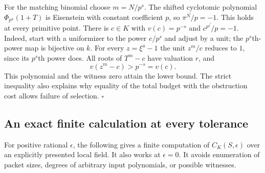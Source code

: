 For the matching binomial choose $m=N/p^s$. The shifted cyclotomic polynomial $\Phi_{p^h}(1+T)$ is Eisenstein with constant coefficient $p$, so $\overline{\pi^N/p}=-1$. This holds at every primitive point. There is $c\in K$ with $v(c)=p^{-s}$ and $\overline{c^{p^s}/p}=-1$. Indeed, start with a uniformizer to the power $e/p^s$ and adjust by a unit; the $p^s$th-power map is bijective on $k$. For every $z=\xi^a-1$ the unit $z^m/c$ reduces to $1$, since its $p^s$th power does. All roots of $T^m-c$ have valuation $r$, and
\[
                   v(z^m-c)>p^{-s}=v(c).
\]
This polynomial and the witness zero attain the lower bound. The strict inequality also explains why equality of the total budget with the obstruction cost allows failure of selection. \hfill$\square$

\subsection{An exact finite calculation at every tolerance}
\label{sec:algorithm}
For positive rational $\epsilon$, the following gives a finite computation of $C_K(S,\epsilon)$ over an explicitly presented local field. It also works at $\epsilon=0$. It avoids enumeration of packet sizes, degrees of arbitrary input polynomials, or possible witnesses.

